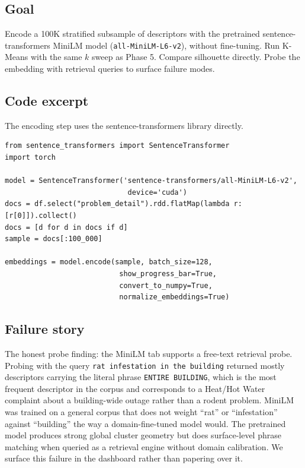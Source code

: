 \documentclass[11pt,letterpaper]{book}
\begin{document}
\subsection*{Goal}

Encode a 100K stratified subsample of descriptors with the pretrained sentence-transformers MiniLM model (\texttt{all-MiniLM-L6-v2}), without fine-tuning. Run K-Means with the same $k$ sweep as Phase 5. Compare silhouette directly. Probe the embedding with retrieval queries to surface failure modes.

\subsection*{Code excerpt}

The encoding step uses the sentence-transformers library directly.

\begin{lstlisting}
from sentence_transformers import SentenceTransformer
import torch

model = SentenceTransformer('sentence-transformers/all-MiniLM-L6-v2',
                             device='cuda')
docs = df.select("problem_detail").rdd.flatMap(lambda r: [r[0]]).collect()
docs = [d for d in docs if d]
sample = docs[:100_000]

embeddings = model.encode(sample, batch_size=128,
                           show_progress_bar=True,
                           convert_to_numpy=True,
                           normalize_embeddings=True)
\end{lstlisting}

\subsection*{Failure story}

The honest probe finding: the MiniLM tab supports a free-text retrieval probe. Probing with the query \texttt{rat infestation in the building} returned mostly descriptors carrying the literal phrase \texttt{ENTIRE BUILDING}, which is the most frequent descriptor in the corpus and corresponds to a Heat/Hot Water complaint about a building-wide outage rather than a rodent problem. MiniLM was trained on a general corpus that does not weight ``rat'' or ``infestation'' against ``building'' the way a domain-fine-tuned model would. The pretrained model produces strong global cluster geometry but does surface-level phrase matching when queried as a retrieval engine without domain calibration. We surface this failure in the dashboard rather than papering over it.
\end{document}
